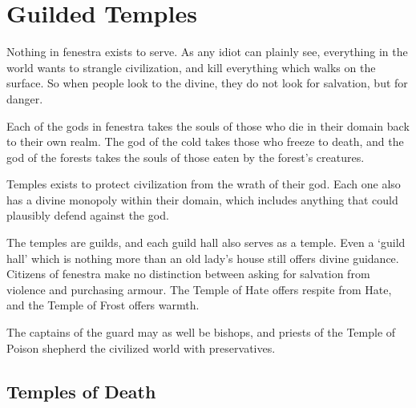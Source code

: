 \chapter{Guilded Temples}

Nothing in \gls{fenestra} exists to serve.
As any idiot can plainly see, everything in the world wants to strangle civilization, and kill everything which walks on the surface.
So when people look to the divine, they do not look for salvation, but for danger.

Each of the gods in \gls{fenestra} takes the souls of those who die in their domain back to their own realm.
The god of the cold takes those who freeze to death, and the god of the forests takes the souls of those eaten by the forest's creatures.

Temples exists to protect civilization from the wrath of their god.
Each one also has a divine monopoly within their domain, which includes anything that could plausibly defend against the god.

The temples are guilds, and each guild hall also serves as a temple.
Even a `guild hall' which is nothing more than an old lady's house still offers divine guidance.
Citizens of \gls{fenestra} make no distinction between asking for salvation from violence and purchasing armour.
The Temple of Hate offers respite from Hate, and the Temple of Frost offers warmth.

The captains of the \gls{guard} may as well be bishops, and priests of the Temple of Poison shepherd the civilized world with preservatives.

\section{Temples of Death}

